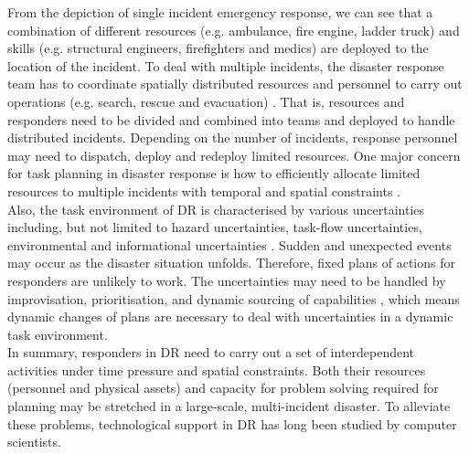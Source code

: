 From the depiction of single incident emergency response, we can see that a combination of different resources (e.g. ambulance, fire engine, ladder truck) and skills (e.g. structural engineers, firefighters and medics) are deployed to the location of the incident. To deal with multiple incidents, the disaster response team has to coordinate spatially distributed resources and personnel to carry out operations (e.g. search, rescue and evacuation) \citep{Chen2005}. That is, resources and responders need to be divided and combined into teams and deployed to handle distributed incidents. Depending on the number of incidents, response personnel may need to dispatch, deploy and redeploy limited resources. One major concern for task planning in disaster response is how to efficiently allocate limited resources to multiple incidents with temporal and spatial constraints \citep{Bradshaw2011}.\\

Also, the task environment of \ac{DR} is characterised by various uncertainties including, but not limited to hazard uncertainties, task-flow uncertainties, environmental and informational uncertainties \citep{Chen2008}. Sudden and unexpected events may occur as the disaster situation unfolds. Therefore, fixed plans of actions for responders are unlikely to work. The uncertainties may need to be handled by improvisation, prioritisation, and dynamic sourcing of capabilities \citep{Faraj2006}, which means dynamic changes of plans are necessary to deal with uncertainties in a dynamic task environment.\\   

In summary, responders in \ac{DR} need to carry out a set of interdependent activities under time pressure and spatial constraints. Both their resources (personnel and physical assets) and capacity for problem solving required for planning may be stretched in a large-scale, multi-incident disaster. To alleviate these problems, technological support in \ac{DR} has long been studied by computer scientists.\\ 




